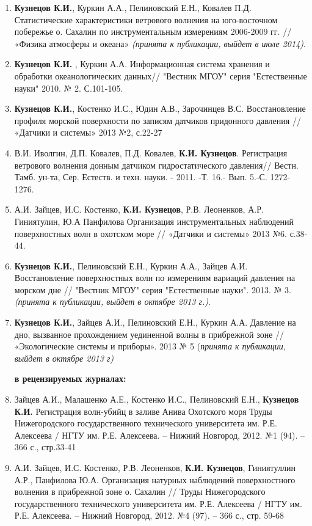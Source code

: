 \begin{enumerate}
  \item \textbf{Кузнецов К.И.}, Куркин А.А., Пелиновский Е.Н., Ковалев П.Д. Статистические характеристики ветрового волнения на юго-восточном побережье о. Сахалин по инструментальным измерениям 2006-2009 гг. // «Физика атмосферы и океана» \emph{(принята к публикации, выйдет в июле 2014)}.
  \item \textbf{Кузнецов К.И.} , Куркин А.А. Информационная система хранения и обработки океанологических данных// "Вестник МГОУ" серия "Естественные науки" 2010. № 2.  С.101-105.
  \item \textbf{Кузнецов К.И.}, Костенко И.С., Юдин А.В., Зарочинцев В.С. Восстановление профиля морской поверхности по записям датчиков придонного давления  // «Датчики и системы» 2013 №2, с.22-27
  \item В.И. Иволгин, Д.П. Ковалев, П.Д. Ковалев, \textbf{К.И. Кузнецов}. Регистрация ветрового волнения донным датчиком гидростатического давления// Вестн. Тамб. ун-та, Сер. Естеств. и техн. науки. - 2011. -Т. 16.- Вып. 5.-С. 1272-1276.
  \item А.И. Зайцев, И.С. Костенко, \textbf{К.И. Кузнецов}, Р.В. Леоненков, А.Р. Гиниятулин,  Ю.А  Панфилова  Организация инструментальных наблюдений поверхностных волн в охотском море // «Датчики и системы» 2013 №6. с.38-44.
  \item \textbf{Кузнецов К.И.}, Пелиновский Е.Н., Куркин А.А., Зайцев А.И. Восстановление поверхностных волн по измерениям  вариаций давления на морском дне // "Вестник МГОУ" серия "Естественные науки". 2013. № 3.  \emph{(принята к публикации, выйдет в октябре 2013 г.)}.
  \item \textbf{Кузнецов К.И.}, Зайцев А.И., Пелиновский Е.Н., Куркин А.А. Давление на дно, вызванное прохождением уединенной волны в прибрежной зоне // «Экологические системы и приборы». 2013 № 5 (\emph{принята к публикации, выйдет в октябре 2013 г)}

\textbf{в рецензируемых журналах:}

  \item Зайцев А.И., Малашенко А.Е., Костенко И.С., Пелиновский Е.Н., \textbf{Кузнецов К.И.} Регистрация волн-убийц в заливе Анива Охотского моря  Труды Нижегородского государственного технического университета им. Р.Е. Алексеева / НГТУ им.  Р.Е. Алексеева. – Нижний Новгород, 2012. №1 (94). – 366 с., стр.33-41
  \item А.И. Зайцев, И.С. Костенко, Р.В. Леоненков, \textbf{К.И. Кузнецов}, Гиниятуллин А.Р., Панфилова Ю.А. Организация натурных наблюдений поверхностного волнения в прибрежной зоне о. Сахалин // Труды Нижегородского государственного технического университета им. Р.Е. Алексеева / НГТУ им.  Р.Е. Алексеева. – Нижний Новгород, 2012. №4 (97). – 366 с., стр. 59-68

\end{enumerate}

